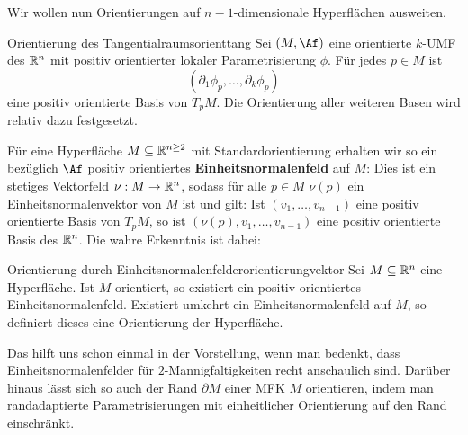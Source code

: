 Wir wollen nun Orientierungen auf $n-1$-dimensionale Hyperflächen ausweiten.
\begin{definition}{Orientierung des Tangentialraums}{orienttang}
Sei $(M, \Af)$ eine orientierte $k$-UMF des $\mathbb{R}^n$ mit positiv orientierter lokaler Parametrisierung $\phi$. Für jedes $p \in M$ ist 
\begin{equation}
(\partial_1 \phi_p, \dots, \partial_k \phi_p)
\end{equation}
eine positiv orientierte Basis von $T_pM$. Die Orientierung aller weiteren Basen wird relativ dazu festgesetzt.
\end{definition}
Für eine Hyperfläche $M \subseteq \mathbb{R}^{n\geq 2}$ mit Standardorientierung erhalten wir so ein bezüglich $\Af$ positiv orientiertes \textbf{Einheitsnormalenfeld} auf $M$: Dies ist ein stetiges Vektorfeld $\nu: M \to \mathbb{R}^n$, sodass für alle $p \in M$ $\nu(p)$ ein Einheitsnormalenvektor von $M$ ist und gilt: Ist $(v_1, \dots, v_{n-1})$ eine positiv orientierte Basis von $T_pM$, so ist $(\nu(p), v_1, \dots, v_{n-1})$ eine positiv orientierte Basis des $\mathbb{R}^n$. Die wahre Erkenntnis ist dabei:
\begin{satz}{Orientierung durch Einheitsnormalenfelder}{orientierungvektor}
Sei $M \subseteq \mathbb{R}^n$ eine Hyperfläche. Ist $M$ orientiert, so existiert ein positiv orientiertes Einheitsnormalenfeld. Existiert umkehrt ein Einheitsnormalenfeld auf $M$, so definiert dieses eine Orientierung der Hyperfläche.
\end{satz}
Das hilft uns schon einmal in der Vorstellung, wenn man bedenkt, dass Einheitsnormalenfelder für $2$-Mannigfaltigkeiten recht anschaulich sind. Darüber hinaus lässt sich so auch der Rand $\partial M$ einer MFK $M$ orientieren, indem man randadaptierte Parametrisierungen mit einheitlicher Orientierung auf den Rand einschränkt.
